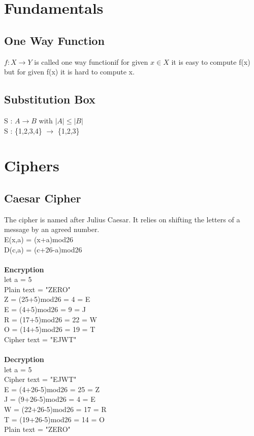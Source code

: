 \documentclass[11pt]{article}
\begin{document}
\section*{Fundamentals}
\subsection*{One Way Function}
$ f : X \rightarrow Y $ is called one way functionif for given $ x \in X $ it is easy to compute f(x) but for given f(x) it is hard to compute x.
\subsection*{Substitution Box}
S : $ A \rightarrow B $ with $ \lvert A \rvert \leq \lvert B \rvert $ \\
S : \{1,2,3,4\} $ \rightarrow $ \{1,2,3\} 
\section*{Ciphers}
\subsection*{Caesar Cipher}
The cipher is named after Julius Caesar. It relies on shifting the letters of a message by an agreed number. \\ 
E(x,a) = (x+a)mod26 \\
D(c,a) = (c+26-a)mod26 \\ \\
\textbf{Encryption} \\
let a = 5 \\
Plain text = "ZERO" \\
Z = (25+5)mod26 = 4 = E \\
E = (4+5)mod26 = 9 = J \\
R = (17+5)mod26 = 22 = W \\
O = (14+5)mod26 = 19 = T \\ 
Cipher text = "EJWT" \\ \\
\textbf{Decryption} \\
let a = 5 \\
Cipher text = "EJWT" \\
E = (4+26-5)mod26 = 25 = Z \\
J = (9+26-5)mod26 = 4 = E \\
W = (22+26-5)mod26 = 17 = R \\
T = (19+26-5)mod26 = 14 = O \\ 
Plain text = "ZERO" \\
\end{document}

